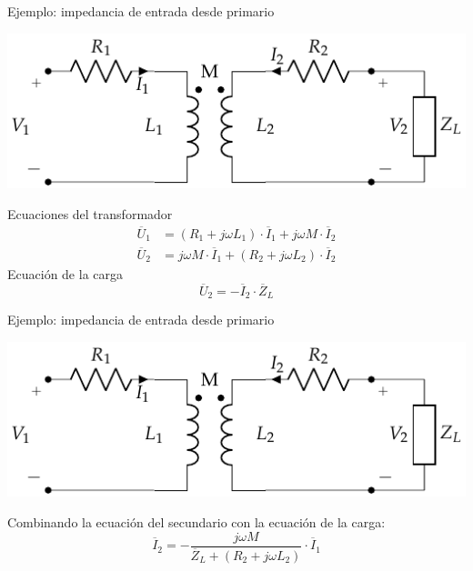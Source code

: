 \documentclass[xcolor={usenames,svgnames,dvipsnames}]{beamer}
\begin{document}
\begin{frame}[label={sec:orgc605a54}]{Ejemplo: impedancia de entrada desde primario}
\begin{center}
\includegraphics[height=0.45\textheight]{../figs/Trafo_Real_ImpSec.pdf}
\end{center}

Ecuaciones del transformador
\begin{align*}
  \overline{U}_1 &= (R_1 + j \omega L_1) \cdot \overline{I}_1 + j \omega M \cdot\overline{I}_2\\
  \overline{U}_2 &= j \omega M \cdot \overline{I}_1 + (R_2 + j \omega L_2) \cdot \overline{I}_2
\end{align*}
Ecuación de la carga
\[
  \overline{U}_2 = - \overline{I}_2 \cdot \overline{Z}_L
\]
\end{frame}
\begin{frame}[label={sec:orgb2ac225}]{Ejemplo: impedancia de entrada desde primario}
\begin{center}
\includegraphics[height=0.45\textheight]{../figs/Trafo_Real_ImpSec.pdf}
\end{center}
Combinando la ecuación del secundario con la ecuación de la carga:
\[
  \overline{I}_2  = - \frac{j \omega M}{\overline{Z}_L + (R_2 + j \omega L_2)} \cdot \overline{I}_1
\]
\end{frame}
\end{document}
